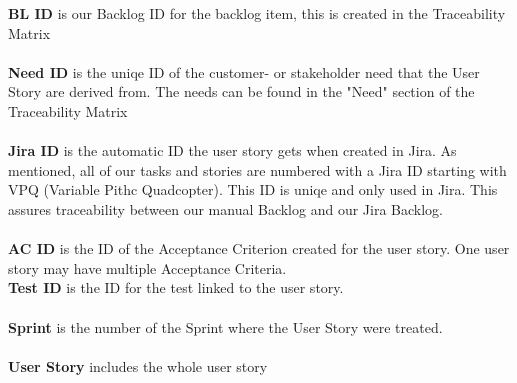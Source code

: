 \krav{}{}{}{}{}{}{}


\noindent \textbf{BL ID} is our Backlog ID for the backlog item, this is created in the Traceability Matrix \\ \\
\textbf{Need ID} is the uniqe ID of the customer- or stakeholder need that the User Story are derived from. The needs can be found in the "Need" section of the Traceability Matrix \\ \\
\textbf{Jira ID} is the automatic ID the user story gets when created in Jira. As mentioned, all of our tasks and stories are numbered with a Jira ID starting with VPQ (Variable Pithc Quadcopter). This ID is uniqe and only used in Jira. This assures traceability between our manual Backlog and our Jira Backlog. \\ \\
\textbf{AC ID} is the ID of the Acceptance Criterion created for the user story. One user story may have multiple Acceptance Criteria.  \\
\textbf{Test ID} is the ID for the test linked to the user story. \\ \\
\textbf{Sprint} is the number of the Sprint where the User Story were treated. \\ \\
\textbf{User Story} includes the whole user story \\
\\
